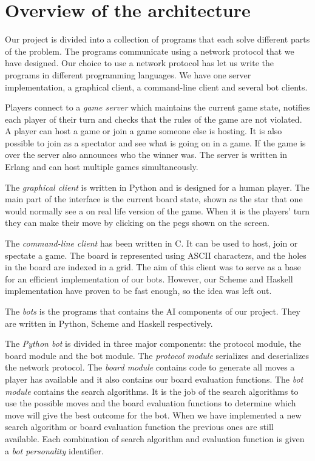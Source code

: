 \section{Overview of the architecture}

Our project is divided into a collection of programs that each solve
different parts of the problem. The programs communicate using a
network protocol that we have designed. Our choice to use a network
protocol has let us write the programs in different programming
languages. We have one server implementation, a graphical client, a
command-line client and several bot clients.

Players connect to a \emph{game server} which maintains the current
game state, notifies each player of their turn and checks that the
rules of the game are not violated. A player can host a game or join a
game someone else is hosting. It is also possible to join as a
spectator and see what is going on in a game. If the game is over the
server also announces who the winner was. The server is written in
Erlang and can host multiple games simultaneously.

The \emph{graphical client} is written in Python and is designed for a
human player. The main part of the interface is the current board
state, shown as the star that one would normally see a on real life
version of the game. When it is the players' turn they can make their
move by clicking on the pegs shown on the screen.

The \emph{command-line client} has been written in C. It can be used to
host, join or spectate a game. The board is represented using ASCII
characters, and the holes in the board are indexed in a grid. The aim
of this client was to serve as a base for an efficient implementation of
our bots. However, our Scheme and Haskell implementation have proven to
be fast enough, so the idea was left out.

The \emph{bots} is the programs that contains the AI components of our
project. They are written in Python, Scheme and Haskell respectively.

The \emph{Python bot} is divided in three major components: the protocol
module, the board module and the bot module. The \emph{protocol module}
serializes and deserializes the network protocol. The \emph{board module}
contains code to generate all moves a player has available and it also
contains our board evaluation functions. The \emph{bot module} contains
the search algorithms. It is the job of the search algorithms to use the
possible moves and the board evaluation functions to determine which move
will give the best outcome for the bot. When we have implemented a new
search algorithm or board evaluation function the previous ones are still
available. Each combination of search algorithm and evaluation function
is given a \emph{bot personality} identifier.

